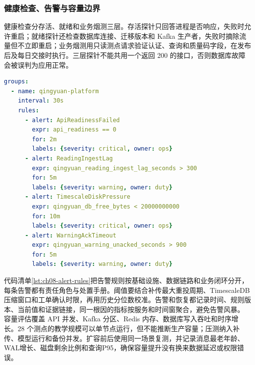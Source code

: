 \subsubsection{健康检查、告警与容量边界}
健康检查分存活、就绪和业务烟测三层。存活探针只回答进程是否响应，失败时允许重启；就绪探针还检查数据库连接、迁移版本和 Kafka 生产者，失败时摘除流量但不立即重启；业务烟测用只读测点请求验证认证、查询和质量码字段，在发布后及每日交接时执行。三层探针不能共用一个返回 200 的接口，否则数据库故障会被误判为应用正常。
\begin{lstlisting}[language=YAML,caption={监控指标与告警规则基线},label={lst:ch08-alert-rules}]
groups:
  - name: qingyuan-platform
    interval: 30s
    rules:
      - alert: ApiReadinessFailed
        expr: api_readiness == 0
        for: 2m
        labels: {severity: critical, owner: ops}
      - alert: ReadingIngestLag
        expr: qingyuan_reading_ingest_lag_seconds > 300
        for: 5m
        labels: {severity: warning, owner: duty}
      - alert: TimescaleDiskPressure
        expr: qingyuan_db_free_bytes < 20000000000
        for: 10m
        labels: {severity: critical, owner: ops}
      - alert: WarningAckTimeout
        expr: qingyuan_warning_unacked_seconds > 900
        for: 5m
        labels: {severity: warning, owner: duty}
\end{lstlisting}
代码清单\ref{lst:ch08-alert-rules}把告警规则按基础设施、数据链路和业务闭环分开，每条告警都有责任角色与处置手册。阈值要结合补传最大重投周期、TimescaleDB压缩窗口和工单确认时限，再用历史分位数校准。告警和恢复都记录时间、规则版本、当前值和证据链接，同一根因的指标按服务和时间窗聚合，避免告警风暴。
容量评估覆盖 API 并发、Kafka 分区、Redis 内存、数据库写入吞吐和时序增长。28 个测点的教学规模可以单节点运行，但不能推断生产容量；压测纳入补传、模型运行和备份并发。扩容前后使用同一场景复测，并记录消息最老年龄、WAL增长、磁盘剩余比例和查询P95，确保容量提升没有换来数据延迟或权限错误。
